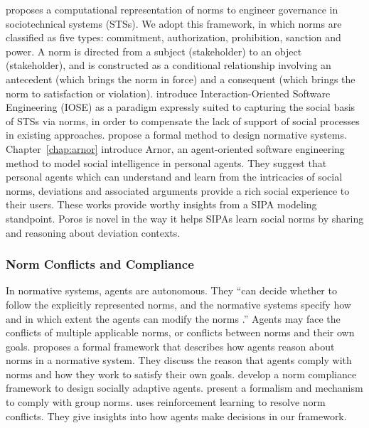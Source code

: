 \documentclass[11pt,          %
               phd,           %
               onehalfspacing %
               ]{ncsuthesis}
\newcommand{\frameworkB}{Poros\xspace}
\begin{document}
\citet{Singh-2013-Norms} proposes a computational representation of norms
to engineer governance in sociotechnical systems (STSs). We adopt this
framework, in which norms are classified as five types: commitment,
authorization, prohibition, sanction and power. A norm is directed from
a subject (stakeholder) to an object (stakeholder), and is constructed
as a conditional relationship involving an antecedent (which brings the
norm in force) and a consequent (which brings the norm to satisfaction
or violation). \citet{WWW-16:IOSE} introduce
Interaction-Oriented Software Engineering (IOSE) as a paradigm expressly
suited to capturing the social basis of STSs via norms, in order to
compensate the lack of support of social processes in existing
approaches. \citet{Hao-FSE16-Norms+formal} propose a formal
method to design normative systems. 
Chapter~\ref{chap:arnor} introduce Arnor, an agent-oriented software
engineering method to model social intelligence in personal agents. They
suggest that personal agents which can understand and learn from the
intricacies of social norms, deviations and associated arguments provide
a rich social experience to their users. These works provide worthy
insights from a SIPA modeling standpoint. \frameworkB is novel in the
way it helps SIPAs learn social norms by sharing and reasoning about
deviation contexts.

\subsubsection{Norm Conflicts and Compliance}
In normative systems, agents are autonomous. They ``can decide whether
to follow the explicitly represented norms, and the normative systems
specify how and in which extent the agents can modify the norms
\citep{Boella2006NormativeSystems}.'' Agents may face the conflicts of
multiple applicable norms, or conflicts between norms and their own
goals. \citet{Lopez2006NormativeFramework} proposes a formal
framework that describes how agents reason about norms in a normative
system. They discuss the reason that agents comply with norms and how
they work to satisfy their own goals. 
 develop a norm compliance
framework to design socially adaptive agents. 
\citet{Aldewereld-TAAS16-GroupNorms} present a formalism and mechanism to
comply with group norms. \citet{Sugawara-IJCAI11-Emergence} uses
reinforcement learning to resolve norm conflicts. They give insights
into how agents make decisions in our framework.
\end{document}
